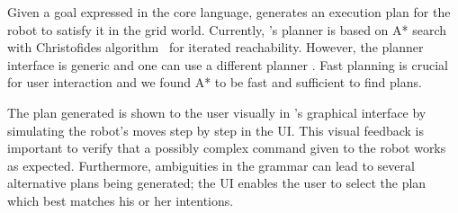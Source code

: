 
Given a goal expressed in the core language,
\tool generates an execution plan for the robot to satisfy it in the grid world.
Currently, \tool's planner is based on A* search~\cite{Astar} with Christofides algorithm~\cite{christofides}
for iterated reachability.
However, the planner interface is generic and one can use
a different planner \cite{golog,pddl,hadasLTLMop,ankushDrona,antlab}.
Fast planning is crucial for user interaction and we found
A* to be fast and sufficient to find plans.

The plan generated is shown to the user visually in \tool's graphical interface
by simulating the robot's moves step by step in the UI.
This visual feedback is important to verify that a possibly complex command given to
the robot works as expected.
Furthermore, ambiguities in the grammar can lead to several alternative plans
being generated; the UI enables the user to select the plan which best matches
his or her intentions.



